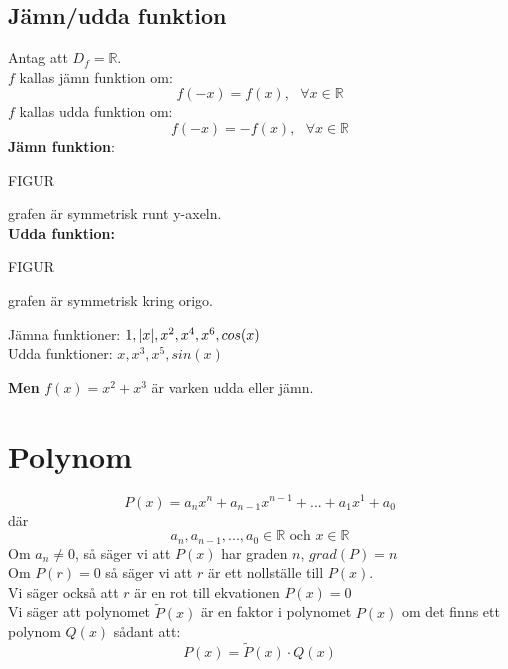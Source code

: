 \subsection{Jämn/udda funktion} %
\label{sub:j_mn_udda_funktion}
Antag att $D_f = \mathbb{R}$. \\
$f$ kallas jämn funktion om:
\[
f(-x) = f(x), \mbox{ } \forall x \in \mathbb{R}
\]
$f$ kallas udda funktion om:
\[
f(-x) = -f(x), \mbox{ } \forall x \in \mathbb{R}
\]
\textbf{Jämn funktion}:
\begin{center}
    FIGUR
\end{center}
grafen är symmetrisk runt y-axeln.\\
\textbf{Udda funktion:}
\begin{center}
    FIGUR
\end{center}
grafen är symmetrisk kring origo.
\begin{Ex}
    Jämna funktioner: $1, \lvert x\rvert, x^2, x^4, x^6, cos(x)$ \\
    Udda funktioner: $x, x^3, x^5, sin(x)$
\end{Ex}
\textbf{Men} $f(x) = x^2 + x^3$ är varken udda eller jämn.

\section{Polynom} %
\label{sec:polynom}
\[
P(x) = a_nx^n + a_{n-1}x^{n-1} + ... + a_1x^1 + a_0
\]
där
\[
a_n, a_{n-1}, ..., a_0 \in \mathbb{R} \mbox{ och } x \in \mathbb{R}
\]
Om $a_n \neq 0$, så säger vi att $P(x)$ har graden $n$, $grad(P) = n$\\
Om $P(r) = 0$ så säger vi att $r$ är ett nollställe till $P(x)$.\\
Vi säger också att $r$ är en rot till ekvationen $P(x) = 0$\\
Vi säger att polynomet $\widetilde{P}(x)$ är en faktor i polynomet $P(x)$ om det finns ett polynom $Q(x)$ sådant att:
\[
P(x) = \widetilde{P}(x) \cdot Q(x)
\]
